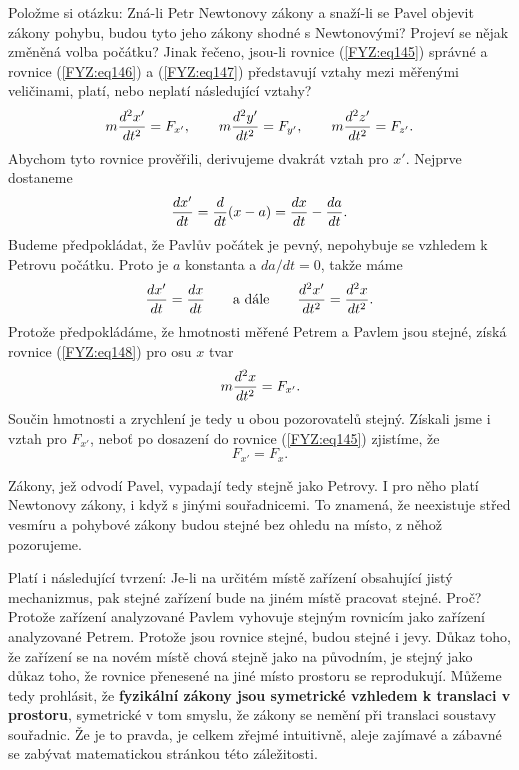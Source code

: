     Položme si otázku: Zná-li Petr Newtonovy zákony a snaží-li se Pavel objevit zákony pohybu, 
    budou tyto jeho zákony shodné s Newtonovými? Projeví se nějak změněná volba počátku? Jinak 
    řečeno, jsou-li rovnice (\ref{FYZ:eq145}) správné a rovnice (\ref{FYZ:eq146}) a 
    (\ref{FYZ:eq147}) představují vztahy mezi měřenými veličinami, platí, nebo neplatí následující 
    vztahy?
    \begin{equation}\label{FYZ:eq148}
      m\dfrac{d^2 x'}{d t^2} = F_{x'}, \qquad
      m\dfrac{d^2 y'}{d t^2} = F_{y'}, \qquad
      m\dfrac{d^2 z'}{d t^2} = F_{z'}.
    \end{equation}
    Abychom tyto rovnice prověřili, derivujeme dvakrát vztah pro \(x'\). Nejprve dostaneme
    \begin{equation*}
      \dfrac{d x'}{d t} =\dfrac{d  }{d t}(x-a) = \dfrac{d x}{d t} - \dfrac{d a}{d t}.
    \end{equation*}
    Budeme předpokládat, že Pavlův počátek je pevný, nepohybuje se vzhledem k Petrovu počátku. 
    Proto je \(a\) konstanta a \(da/dt=0\), takže máme
    \begin{equation*}
      \dfrac{d x'}{d t} = \dfrac{d x}{d t} \qquad\text{a dále}\qquad \dfrac{d^2 x'}{d t^2} = \dfrac{d^2 x}{d t^2}.
    \end{equation*}
    Protože předpokládáme, že hmotnosti měřené Petrem a Pavlem jsou stejné, získá rovnice 
    (\ref{FYZ:eq148}) pro osu \(x\) tvar
    \begin{equation*}
      m\dfrac{d^2 x}{d t^2} = F_{x'}.
    \end{equation*}
    Součin hmotnosti a zrychlení je tedy u obou pozorovatelů stejný. Získali jsme i vztah pro 
    \(F_{x'}\), neboť po dosazení do rovnice (\ref{FYZ:eq145}) zjistíme, že
    \begin{equation*}
      F_{x'} = F_{x}.
    \end{equation*}
    
    Zákony, jež odvodí Pavel, vypadají tedy stejně jako Petrovy. I pro něho platí Newtonovy zákony, 
    i když s jinými souřadnicemi. To znamená, že neexistuje střed vesmíru a pohybové zákony budou 
    stejné bez ohledu na místo, z něhož pozorujeme.
    
    Platí i následující tvrzení: Je-li na určitém místě zařízení obsahující jistý mechanizmus, pak 
    stejné zařízení bude na jiném místě pracovat stejné. Proč? Protože zařízení analyzované Pavlem 
    vyhovuje stejným rovnicím jako zařízení analyzované Petrem. Protože jsou rovnice stejné, budou 
    stejné i jevy. Důkaz toho, že zařízení se na novém místě chová stejně jako na původním, je 
    stejný jako důkaz toho, že rovnice přenesené na jiné místo prostoru se reprodukují. Můžeme tedy 
    prohlásit, že \textbf{fyzikální zákony jsou symetrické vzhledem k translaci v prostoru}, 
    symetrické v tom smyslu, že zákony se nemění při translaci soustavy souřadnic. Že je to pravda, 
    je celkem zřejmé intuitivně, aleje zajímavé a zábavné se zabývat matematickou stránkou této 
    záležitosti.
    
